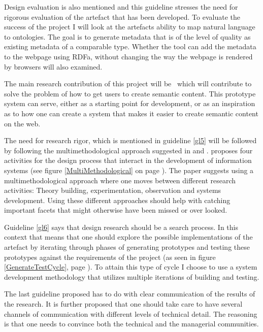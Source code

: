 Design evaluation is also mentioned and this guideline stresses the need for rigorous evaluation of the artefact that has been developed.
To evaluate the success of the project I will look at the artefacts ability to map natural language to ontologies.
The goal is to generate metadata that is of the level of quality as existing metadata of a comparable type.
Whether the tool can add the metadata to the webpage using RDFa, without changing the way the webpage is rendered by browsers will also examined.

The main research contribution of this project will be \theartefact\,
which will contribute to solve the problem of how to get users to create semantic content.
This prototype system can serve, either as a starting point for development,
or as an inspiration as to how one can create a system that makes it easier to create semantic content on the web.

The need for research rigor, which is mentioned in guideline \ref{gl5} will be followed by following the multimethodological approach suggested in \citet{Chen1990} and \citet{NunamakerJr1990}.
\citet{Chen1990} proposes four activities for the design process that interact in the development of information systems
(see figure \ref{MultiMethodological} on page \pageref{MultiMethodological}).
The paper suggests using a multimethodological approach where one moves between different research activities:
Theory building, experimentation, observation and systems development.
Using these different approaches should help with catching important facets that might otherwise have been missed or over looked.

Guideline \ref{gl6} says that design research should be a search process.
In this context that means that one should explore the possible implementations of the artefact by iterating through phases of
generating prototypes and testing these prototypes against the requirements of the project (as seen in figure \ref{GenerateTestCycle},
page \pageref{GenerateTestCycle}).
To attain this type of cycle I choose to use a system development methodology that utilizes multiple iterations of building and testing.

The last guideline proposed has to do with clear communication of the results of the research.
It is further proposed that one should take care to have several channels of communication with different levels of technical detail.
The reasoning is that one needs to convince both the technical and the managerial communities.

